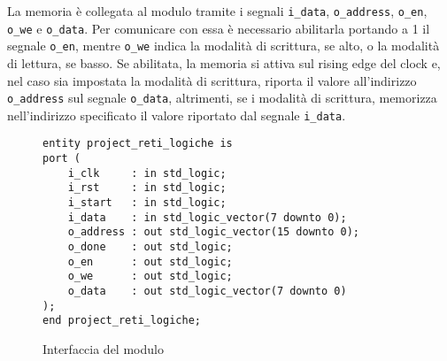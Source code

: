 La memoria è collegata al modulo tramite i segnali \verb|i_data|, \verb|o_address|, \verb|o_en|, \verb|o_we| e \verb|o_data|. Per comunicare con essa è necessario abilitarla portando a 1 il segnale \verb|o_en|, mentre \verb|o_we| indica la modalità di scrittura, se alto, o la modalità di lettura, se basso. Se abilitata, la memoria si attiva sul rising edge del clock e, nel caso sia impostata la modalità di scrittura, riporta il valore all'indirizzo \verb|o_address| sul segnale \verb|o_data|, altrimenti, se i modalità di scrittura, memorizza nell'indirizzo specificato il valore riportato dal segnale \verb|i_data|.

\begin{figure}[!ht]
    \centering
    \begin{varwidth}{\linewidth}
        \begin{verbatim}
entity project_reti_logiche is
port (
    i_clk     : in std_logic;
    i_rst     : in std_logic;
    i_start   : in std_logic;
    i_data    : in std_logic_vector(7 downto 0);
    o_address : out std_logic_vector(15 downto 0);
    o_done    : out std_logic;
    o_en      : out std_logic;
    o_we      : out std_logic;
    o_data    : out std_logic_vector(7 downto 0)
);
end project_reti_logiche;
    \end{verbatim}
    \end{varwidth}
    \caption{Interfaccia del modulo}
    \label{code:interfacciacomponente}
\end{figure}
